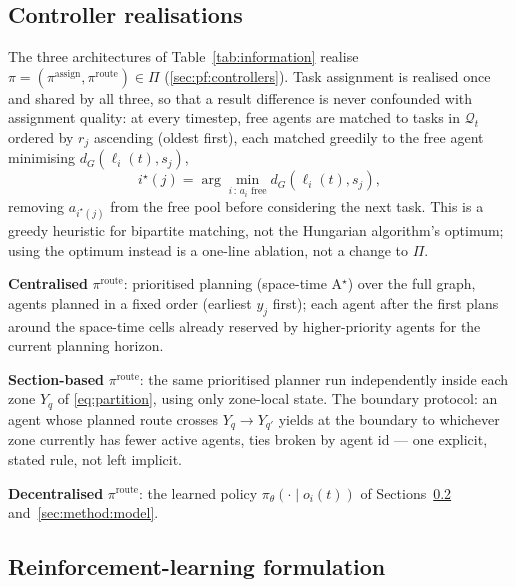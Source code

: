 \documentclass[../main.tex]{subfiles}
\begin{document}
\subsection{Controller realisations}
\label{sec:method:controllers}

The three architectures of Table~\ref{tab:information} realise
$\pi=(\pi^{\text{assign}},\pi^{\text{route}}) \in \Pi$
(\ref{sec:pf:controllers}). Task assignment is realised once and shared by
all three, so that a result difference is never confounded with assignment
quality: at every timestep, free agents are matched to tasks in
$\mathcal{Q}_t$ ordered by $r_j$ ascending (oldest first), each matched
greedily to the free agent minimising $d_G(\ell_i(t), s_j)$,
\begin{equation}
  i^\star(j) = \arg\min_{i \,:\, a_i \text{ free}} d_G(\ell_i(t), s_j) ,
  \label{eq:assignmentrule}
\end{equation}
removing $a_{i^\star(j)}$ from the free pool before considering the next
task. This is a greedy heuristic for bipartite matching, not the Hungarian
algorithm's optimum; using the optimum instead is a one-line ablation, not a
change to $\Pi$.

\textbf{Centralised} $\pi^{\text{route}}$: prioritised planning
(space-time A$^\star$) over the full graph, agents planned in a fixed order
(earliest $y_j$ first); each agent after the first plans around the
space-time cells already reserved by higher-priority agents for the current
planning horizon.

\textbf{Section-based} $\pi^{\text{route}}$: the same prioritised planner run
independently inside each zone $Y_q$ of \eqref{eq:partition}, using only
zone-local state. The boundary protocol: an agent whose planned route crosses
$Y_q \to Y_{q'}$ yields at the boundary to whichever zone currently has fewer
active agents, ties broken by agent id --- one explicit, stated rule, not left
implicit.

\textbf{Decentralised} $\pi^{\text{route}}$: the learned policy
$\pi_\theta(\cdot\mid o_i(t))$ of Sections~\ref{sec:method:rl}
and~\ref{sec:method:model}.

\subsection{Reinforcement-learning formulation}
\label{sec:method:rl}
\end{document}
